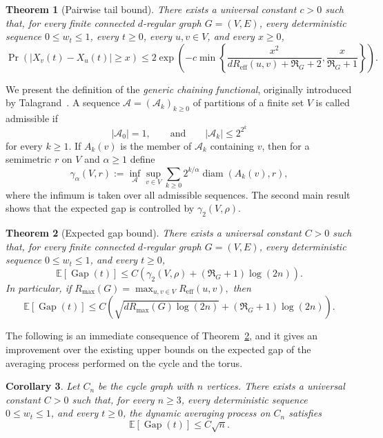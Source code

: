 \documentclass[11pt]{article}
\numberwithin{equation}{section}
\newtheorem{theorem}{Theorem}[section]
\newtheorem{corollary}[theorem]{Corollary}
\newcommand{\E}{\mathbb{E}}
\newcommand{\1}{\mathbf{1}}
\newcommand{\Gap}{\operatorname{Gap}}
\begin{document}
\begin{theorem}[Pairwise tail bound]
\label{thm:pairwise-tail}
There exists a universal constant \(c>0\) such that, for every finite connected \(d\)-regular graph \(G=(V,E)\), every deterministic sequence \(0\le w_t\le1\), every \(t\ge0\), every \(u,v\in V\), and every \(x\ge0\),
\[
\Pr\left(
|X_v(t)-X_u(t)|\ge x
\right)
\le
2\exp\left(
-c\min\left\{
\frac{x^2}{dR_{\mathrm{eff}}(u,v)+\Re_G+2},
\frac{x}{\Re_G+1}
\right\}
\right).
\]
\end{theorem}

We present the definition of the \emph{generic chaining functional}, originally introduced by Talagrand~\cite{TalagrandOrig, TalagrandGamma}. A sequence \(\mathcal A=(\mathcal A_k)_{k\ge0}\) of partitions of a finite set \(V\) is called admissible if
\[
|\mathcal A_0|=1,
\qquad \text{and} \qquad
|\mathcal A_k|\le2^{2^k}
\]
for every \(k\ge1\). If \(A_k(v)\) is the member of \(\mathcal A_k\) containing \(v\), then for a semimetric \(r\) on \(V\) and \(\alpha\ge1\) define
\[
\gamma_\alpha(V,r)
:=
\inf_{\mathcal A}
\sup_{v\in V}
\sum_{k\ge0}
2^{k/\alpha}
\operatorname{diam}(A_k(v),r),
\]
where the infimum is taken over all admissible sequences. The second main result shows that the expected gap is controlled by $\gamma_2(V,\rho)$.

\begin{theorem}[Expected gap bound]
\label{thm:general-upper}
There exists a universal constant \(C>0\) such that, for every finite connected \(d\)-regular graph \(G=(V,E)\), every deterministic sequence \(0\le w_t\le1\), and every \(t\ge0\),
\[
\E[\Gap(t)]
\le
C\left(
\gamma_2(V,\rho)
+
(\Re_G+1)\log(2n)
\right).
\]
In particular, if
\(
R_{\max}(G)
=
\max_{u,v\in V}R_{\mathrm{eff}}(u,v),
\)
then
\[
\E[\Gap(t)]
\le
C\left(
\sqrt{dR_{\max}(G)\log(2n)}
+
(\Re_G+1)\log(2n)
\right).
\]
\end{theorem}

The following is an immediate consequence of Theorem~\ref{thm:general-upper}, and it gives an improvement over the existing upper bounds on the expected gap of the averaging process performed on the cycle and the torus.

\begin{corollary}
\label{cor:cycle-upper}
Let $C_n$ be the cycle graph with $n$ vertices. There exists a universal constant \(C>0\) such that, for every \(n\ge3\), every deterministic sequence \(0\le w_t\le1\), and every \(t\ge0\), the dynamic averaging process on \(C_n\) satisfies
\[
\E[\Gap(t)]
\le
C\sqrt n.
\]
\end{corollary}
\end{document}
